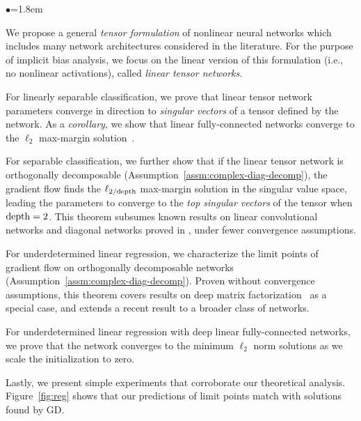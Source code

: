 \documentclass{article} %
\begin{document}
\begin{list}{\tiny{$\bullet$}}{\leftmargin=1.8em}
\setlength\itemsep{0em}
\item We propose a general \emph{tensor formulation} of nonlinear neural networks which includes many network architectures considered in the literature. For the purpose of implicit bias analysis, we focus on the linear version of this formulation (i.e., no nonlinear activations), called \emph{linear tensor networks}.
\item For linearly separable classification, we prove that linear tensor network parameters converge in direction to \emph{singular vectors} of a tensor defined by the network. 
As a \emph{corollary}, we show that linear fully-connected networks converge to the $\ell_2$ max-margin solution~\citep{ji2020directional}.
\item For separable classification, we further show that if the linear tensor network is orthogonally decomposable (Assumption~\ref{assm:complex-diag-decomp}), the gradient flow finds the $\ell_{2/{\rm depth}}$ max-margin solution in the singular value space, leading the parameters to converge to the \emph{top singular vectors} of the tensor when ${\rm depth} = 2$. This theorem subsumes known results on linear convolutional networks and diagonal networks proved in \citet{gunasekar2018implicit}, under fewer convergence assumptions.
\item For underdetermined linear regression, we characterize the limit points of gradient flow on orthogonally decomposable networks (Assumption~\ref{assm:complex-diag-decomp}). Proven without convergence assumptions, this theorem covers results on deep matrix factorization~\citep{arora2019implicit} as a special case, and extends a recent result \citep{woodworth2020kernel} to a broader class of networks.
\item For underdetermined linear regression with deep linear fully-connected networks, we prove that the network converges to the minimum $\ell_2$ norm solutions as we scale the initialization to zero.
\item Lastly, we present simple experiments that corroborate our theoretical analysis. Figure~\ref{fig:reg} shows that our predictions of limit points match with solutions found by GD. 
\end{list}
\end{document}
